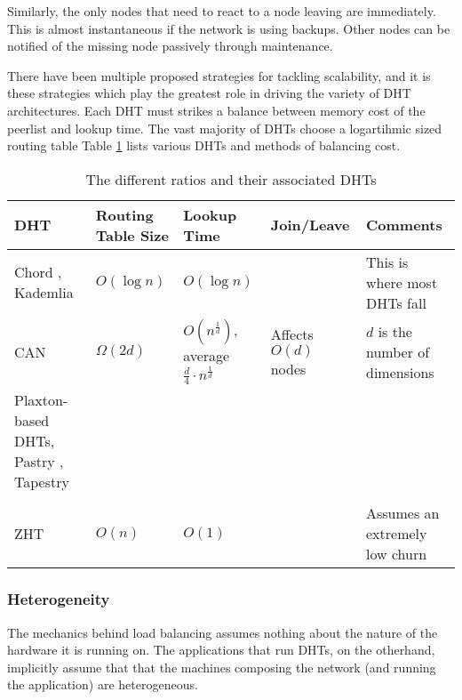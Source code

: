 \documentclass[10pt,letterpaper]{report}
\begin{document}
Similarly, the only nodes that need to react to a node leaving are immediately.
This is almost instantaneous if the network is using backups.
Other nodes can be notified of the missing node passively through maintenance.

There have been multiple proposed strategies for tackling scalability, and it is these strategies which play the greatest role in driving the variety of DHT architectures. 
Each DHT must strikes a balance between memory cost of the peerlist and lookup time. 
The vast majority of DHTs choose a logartihmic sized routing table
Table \ref{tab:tradeoffs} lists various DHTs and methods of balancing cost.


\begin{table}[h]
	\small
    \centering
    \begin{tabularx}{\textwidth}{ |X|X|X|X|X| }
    \hline
    DHT & Routing Table Size & Lookup Time & Join/Leave & Comments \\ \hline  
    Chord \cite{chord}, Kademlia \cite{kademlia} & $O(\log n)$ & $O(\log n)$ & & This is where most DHTs fall  \\ \hline
    CAN \cite{can} & $\Omega(2d)$ & $O(n^{\frac{1}{d}})$, average $\frac{d}{4}\cdot n^{\frac{1}{d}}$ & Affects $O(d)$ nodes & $d$ is the number of dimensions \\ \hline
    
    Plaxton-based DHTs, Pastry \cite{pastry}, Tapestry \cite{tapestry} &  & & & \\ \hline
    & & & & \\ \hline  
    ZHT \cite{li2013zht}&   $O(n)$& $O(1)$ &  &Assumes an extremely low churn \\ \hline
    \end{tabularx}
    \caption{The different ratios and their associated DHTs}
    \label{tab:tradeoffs}
\end{table}

\subsubsection{Heterogeneity}
The mechanics behind load balancing assumes nothing about the nature of the hardware it is running on.
The applications that run DHTs, on the otherhand, implicitly assume that that the machines composing the network (and running the application) are heterogeneous.
\end{document}
